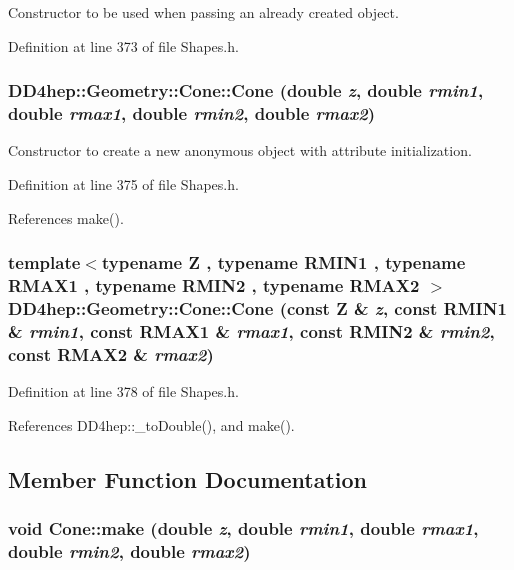 Constructor to be used when passing an already created object. 

Definition at line 373 of file Shapes.h.\hypertarget{class_d_d4hep_1_1_geometry_1_1_cone_a88d9236d88f467a6a17b1b729cf54afa}{
\subsubsection[{Cone}]{\setlength{\rightskip}{0pt plus 5cm}DD4hep::Geometry::Cone::Cone (double {\em z}, \/  double {\em rmin1}, \/  double {\em rmax1}, \/  double {\em rmin2}, \/  double {\em rmax2})}}
\label{class_d_d4hep_1_1_geometry_1_1_cone_a88d9236d88f467a6a17b1b729cf54afa}


Constructor to create a new anonymous object with attribute initialization. 

Definition at line 375 of file Shapes.h.

References make().\hypertarget{class_d_d4hep_1_1_geometry_1_1_cone_a6656bd2a3bdcb21a2a1a6bb259812cb3}{
\subsubsection[{Cone}]{\setlength{\rightskip}{0pt plus 5cm}template$<$typename Z , typename RMIN1 , typename RMAX1 , typename RMIN2 , typename RMAX2 $>$ DD4hep::Geometry::Cone::Cone (const Z \& {\em z}, \/  const RMIN1 \& {\em rmin1}, \/  const RMAX1 \& {\em rmax1}, \/  const RMIN2 \& {\em rmin2}, \/  const RMAX2 \& {\em rmax2})}}
\label{class_d_d4hep_1_1_geometry_1_1_cone_a6656bd2a3bdcb21a2a1a6bb259812cb3}


Definition at line 378 of file Shapes.h.

References DD4hep::\_\-toDouble(), and make().

\subsection{Member Function Documentation}
\hypertarget{class_d_d4hep_1_1_geometry_1_1_cone_ace6de89d73b615ba28493951b83883a0}{
\subsubsection[{make}]{\setlength{\rightskip}{0pt plus 5cm}void Cone::make (double {\em z}, \/  double {\em rmin1}, \/  double {\em rmax1}, \/  double {\em rmin2}, \/  double {\em rmax2})}}
\label{class_d_d4hep_1_1_geometry_1_1_cone_ace6de89d73b615ba28493951b83883a0}


